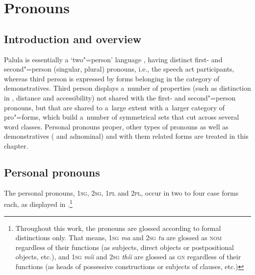 \chapter{Pronouns}
\label{chap:5}

\section{Introduction and overview}
\label{sec:5-1}


Palula is essentially a `two"=person' language \citep[4--15]{bhat2004}, having distinct first- and second"=person (singular, plural) pronouns, i.e., the speech act participants, whereas third person is expressed by forms belonging in the category of demonstratives. Third person displays a~number of properties (such as distinction in , distance and accessibility) not shared with the first- and second"=person pronouns, but that are shared to a~large extent with a~larger category of pro"=forms, which build a~number of symmetrical sets that cut across several word classes. Personal pronouns proper, other types of pronouns as well as demonstratives ( and adnominal) and with them related forms are treated in this chapter.


\section{Personal pronouns}
\label{sec:5-2}

The personal pronouns, \textsc{1sg}, \textsc{2sg}, \textsc{1pl} and \textsc{2pl}, occur in two to four case forms each, as displayed in .\footnote{Throughout this work, the pronouns are glossed according to formal distinctions only. That means, \textsc{1sg} \textit{ma} and \textsc{2sg} \textit{tu} are glossed as \textsc{nom} regardless of their functions (as subjects, direct objects or postpositional objects, etc.), and \textsc{1sg} \textit{míi} and \textsc{2sg} \textit{thíi} are glossed as \textsc{gn} regardless of their functions (as heads of possessive constructions or subjects of   clauses, etc.)} 

